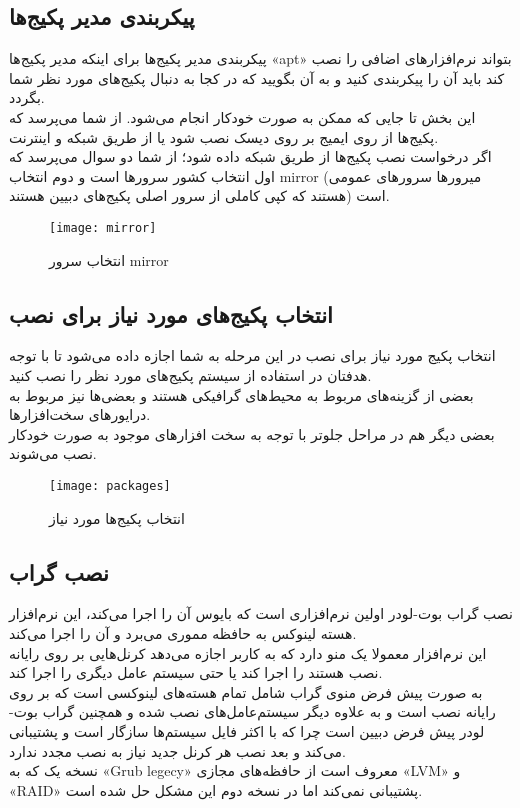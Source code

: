 \subsection{پیکربندی مدیر پکیج‌ها}
\begin{frame}{پیکربندی مدیر پکیج‌ها}
  برای اینکه مدیر پکیج‌ها «apt» بتواند نرم‌افزارهای اضافی را نصب کند باید آن را پیکربندی کنید و به آن بگویید که در کجا به دنبال پکیج‌های مورد نظر شما بگردد.\\
  این بخش تا جایی که ممکن به صورت خودکار انجام می‌شود. از شما می‌پرسد که پکیج‌ها از روی ایمیج بر روی دیسک نصب شود یا از طریق شبکه و اینترنت.\\
  اگر درخواست نصب پکیج‌ها از طریق شبکه داده شود؛ از شما دو سوال می‌پرسد که اول انتخاب کشور سرورها است و دوم انتخاب mirror (میرور‌ها سرورهای عمومی هستند که کپی کاملی از سرور اصلی پکیج‌های دبیین هستند) است.
  \begin{figure}
    \texttt{[image: mirror]}
    \caption{انتخاب سرور mirror~\cite{fig:deb_mirror}}
  \end{figure}
\end{frame}
\subsection{انتخاب پکیج‌های مورد نیاز برای نصب}
\begin{frame}{انتخاب پکیج مورد نیاز برای نصب}
  در این مرحله به شما اجازه داده می‌شود تا با توجه هدفتان در استفاده از سیستم پکیج‌های مورد نظر را نصب کنید.\\
  بعضی از گزینه‌های مربوط به محیط‌های گرافیکی هستند و بعضی‌ها نیز مربوط به درایورهای سخت‌افزارها.\\
  بعضی دیگر هم در مراحل جلوتر با توجه به سخت افزار‌های موجود به صورت خودکار نصب می‌شوند.\\
  \begin{figure}
    \texttt{[image: packages]}
    \caption{انتخاب پکیج‌ها مورد نیاز~\cite{fig:deb_packages}}
  \end{figure}
\end{frame}
\subsection{نصب گراب}
\begin{frame}{نصب گراب}
  بوت-لودر اولین نرم‌افزاری است که بایوس آن را اجرا می‌کند، این نرم‌افزار هسته لینوکس به حافظه مموری می‌برد و آن را اجرا می‌کند.\\
  این نرم‌افزار معمولا یک منو دارد که به کاربر اجازه می‌دهد کرنل‌هایی بر روی رایانه نصب هستند را اجرا کند یا حتی سیستم عامل دیگری را اجرا کند.\\
  به صورت پیش فرض منوی گراب شامل تمام هسته‌های لینوکسی است که بر روی رایانه نصب است و به علاوه دیگر سیستم‌عامل‌های نصب شده و همچنین گراب بوت-لودر پیش فرض دبیین است چرا که با اکثر فایل سیستم‌ها سازگار است و پشتیبانی می‌کند و بعد نصب هر کرنل جدید نیاز به نصب مجدد ندارد.\\
  نسخه یک که به «Grub legecy» معروف است از حافظه‌های مجازی «LVM» و «RAID» پشتیبانی نمی‌کند اما در نسخه دوم این مشکل حل شده است.\\
\end{frame}
